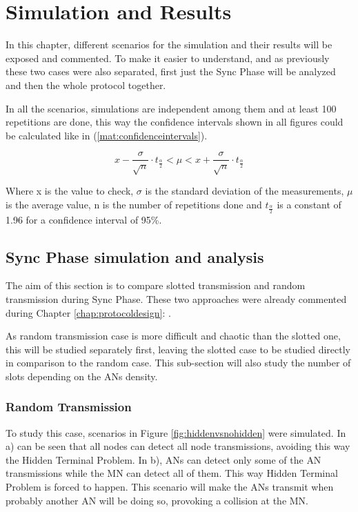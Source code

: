 \chapter{Simulation and Results}
\label{chap:simulationandresults}

In this chapter, different scenarios for the simulation and their results will be exposed and commented. To make it easier to understand, and as 
previously these two cases were also separated, first just the Sync Phase will be analyzed and then the whole protocol together.

In all the scenarios, simulations are independent among them and at least 100 repetitions are done, this way the confidence intervals
shown in all figures could be calculated like in (\ref{mat:confidenceintervals}).

\begin{equation}
  x-\frac{\sigma}{\sqrt{n}}\cdot t_{\frac{\alpha}{2}} < \mu < x+\frac{\sigma}{\sqrt{n}}\cdot t_{\frac{\alpha}{2}}
  \label{mat:confidenceintervals}
\end{equation}

Where x is the value to check, $\sigma$ is the standard deviation of the measurements, $\mu$ is the average value, n is the number of repetitions done and 
$t_{\frac{\alpha}{2}}$ is a constant of 1.96 for a confidence interval of 95\%.

\section{Sync Phase simulation and analysis}

The aim of this section is to compare slotted transmission and random transmission during Sync Phase. These two approaches were already commented 
during Chapter \ref{chap:protocoldesign}: .

As random transmission case is more difficult and chaotic than the slotted one, this will be studied separately first, leaving the slotted case 
to be studied directly in comparison to the random case. This sub-section will also study the number of slots depending on the \acp{AN} 
density.

\subsection{Random Transmission}

To study this case, scenarios in Figure \ref{fig:hiddenvsnohidden} were simulated. In a) can be seen that all nodes can detect all node 
transmissions, avoiding this way the Hidden Terminal Problem. In b), \acp{AN} can detect only some of the \ac{AN} transmissions while the 
\ac{MN} can detect all of them. This way Hidden Terminal Problem is forced to happen. This scenario will make the \acp{AN} transmit when 
probably another \ac{AN} will be doing so, provoking a collision at the \ac{MN}.


